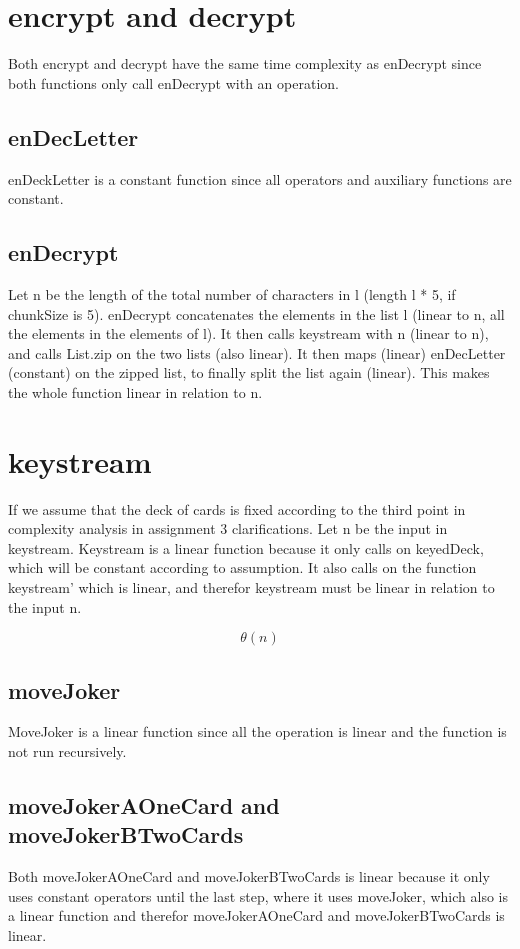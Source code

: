\documentclass[12pt, a4paper]{article}
\begin{document}
\section{encrypt and decrypt}
Both encrypt and decrypt have the same time complexity as enDecrypt since both functions only call enDecrypt with an operation.

\subsection{enDecLetter}
enDeckLetter is a constant function since all operators and auxiliary functions are constant.

\subsection{enDecrypt}
Let n be the length of the total number of characters in l (length l * 5, if chunkSize is 5). enDecrypt concatenates the elements in the list l (linear to n, all the elements in the elements of l). It then calls keystream with n (linear to n), and calls List.zip on the two lists (also linear). It then maps (linear) enDecLetter (constant) on the zipped list, to finally split the list again (linear). This makes the whole function linear in relation to n.


\section{keystream}
If we assume that the deck of cards is fixed according to the third point in complexity analysis in assignment 3 clarifications. Let n be the input in keystream.
Keystream is a linear function because it only calls on keyedDeck, which will be constant according to assumption. It also calls on the function keystream' which is linear, and therefor keystream must be linear in relation to the input n.

$$ \theta(n)$$

\subsection{moveJoker}
MoveJoker is a linear function since all the operation is linear and the function is not run recursively.

\subsection{moveJokerAOneCard and moveJokerBTwoCards}
Both moveJokerAOneCard and moveJokerBTwoCards is linear because it only uses constant operators until the last step, where it uses moveJoker, which also is a linear function and therefor moveJokerAOneCard and moveJokerBTwoCards is linear.
\end{document}
